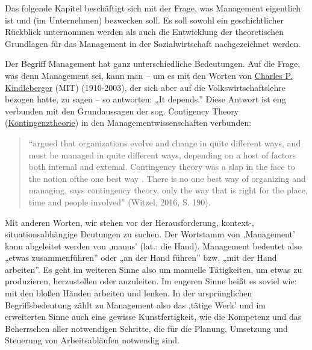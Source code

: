 \documentclass[
  letterpaper,
]{book}
\begin{document}
Das folgende Kapitel beschäftigt sich mit der Frage, was Management
eigentlich ist und (im Unternehmen) bezwecken soll. Es soll sowohl ein
geschichtlicher Rückblick unternommen werden als auch die Entwicklung
der theoretischen Grundlagen für das Management in der Sozialwirtschaft
nachgezeichnet werden.

Der Begriff Management hat ganz unterschiedliche Bedeutungen. Auf die
Frage, was denn Management sei, kann man -- um es mit den Worten von
\href{https://en.wikipedia.org/wiki/Charles_P._Kindleberger}{Charles P.
Kindleberger} (MIT) (1910-2003), der sich aber auf die
Volkswirtschaftslehre bezogen hatte, zu sagen -- so antworten: „It
depends.'' Diese Antwort ist eng verbunden mit den Grundaussagen der
sog. Contigency Theory
(\href{https://de.wikipedia.org/wiki/Kontingenztheorie_(F\%C3\%BChrungslehre)}{Kontingenztheorie})
in den Managementwissenschaften verbunden:

\begin{quote}
``argued that organizations evolve and change in quite different ways,
and must be managed in quite different ways, depending on a host of
factors both internal and extemal. Contingency theory was a slap in the
face to the notion ofthe \textquotesingle one best way\textquotesingle{}
. There is no \textquotesingle one best way\textquotesingle{} of
organizing and managing, says contingency theory, only the way that is
right for the place, time and people involved'' (Witzel, 2016, S. 190).
\end{quote}

Mit anderen Worten, wir stehen vor der Herausforderung, kontext-,
situationsabhängige Deutungen zu suchen. Der Wortstamm von ‚Management'
kann abgeleitet werden von ‚manus' (lat.: die Hand). Management bedeutet
also „etwas zusammenführen'' oder „an der Hand führen'' bzw. „mit der
Hand arbeiten''. Es geht im weiteren Sinne also um manuelle Tätigkeiten,
um etwas zu produzieren, herzustellen oder anzuleiten. Im engeren Sinne
heißt es soviel wie: mit den bloßen Händen arbeiten und lenken. In der
ursprünglichen Begriffsbedeutung zählt zu Management also das ‚tätige
Werk' und im erweiterten Sinne auch eine gewisse Kunstfertigkeit, wie
die Kompetenz und das Beherrschen aller notwendigen Schritte, die für
die Planung, Umsetzung und Steuerung von Arbeitsabläufen notwendig sind.
\end{document}
